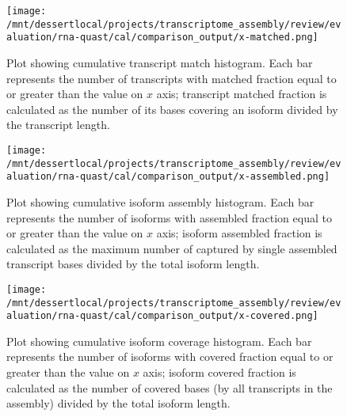 \documentclass[12pt,a4paper]{article}
\begin{document}
\begin{figure}[t]
\centering
\texttt{[image: /mnt/dessertlocal/projects/transcriptome\_assembly/review/evaluation/rna-quast/cal/comparison\_output/x-matched.png]}
\caption{Plot showing cumulative transcript match histogram. Each bar represents the number of transcripts with matched fraction equal to or greater than the value on $x$ axis; transcript matched fraction is calculated as the number of its bases covering an isoform divided by the transcript length.}
\end{figure}
\FloatBarrier
\clearpage


\begin{figure}[t]
\centering
\texttt{[image: /mnt/dessertlocal/projects/transcriptome\_assembly/review/evaluation/rna-quast/cal/comparison\_output/x-assembled.png]}
\caption{Plot showing cumulative isoform assembly histogram. Each bar represents the number of isoforms with assembled fraction equal to or greater than the value on $x$ axis; isoform assembled fraction is calculated as the maximum number of captured by single assembled transcript bases divided by the total isoform length.}
\end{figure}
\FloatBarrier
\clearpage


\begin{figure}[t]
\centering
\texttt{[image: /mnt/dessertlocal/projects/transcriptome\_assembly/review/evaluation/rna-quast/cal/comparison\_output/x-covered.png]}
\caption{Plot showing cumulative isoform coverage histogram. Each bar represents the number of isoforms with covered fraction equal to or greater than the value on $x$ axis; isoform covered fraction is calculated as the number of covered bases (by all transcripts in the assembly) divided by the total isoform length.}
\end{figure}
\FloatBarrier
\clearpage
\end{document}
